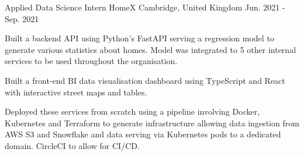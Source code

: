 \begin{cventries}
  \cventry
    {Applied Data Science Intern} %
    {HomeX} %
    {Cambridge, United Kingdom} %
    {Jun. 2021 - Sep. 2021} %
    {
      \begin{cvitems} %
        \item {Built a backend API using Python's FastAPI serving a regression model to generate various statistics about homes. Model was integrated to 5 other internal services to be used throughout the organisation.}
        \item {Built a front-end BI data visualisation dashboard using TypeScript and React with interactive street maps and tables.}
        \item {Deployed these services from scratch using a pipeline involving Docker, Kubernetes and Terraform to generate infrastructure allowing data ingestion from AWS S3 and Snowflake and data serving via Kubernetes pods to a dedicated domain. CircleCI to allow for CI/CD.}
      \end{cvitems}
    }


\end{cventries}
